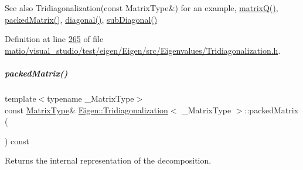 \begin{DoxySeeAlso}{See also}
Tridiagonalization(const Matrix\+Type\&) for an example, \hyperlink{group___eigenvalues___module_a000f7392eda930576ffd2af1fae54af2}{matrix\+Q()}, \hyperlink{group___eigenvalues___module_a47858b3895e64acafb1bb2e97f98a154}{packed\+Matrix()}, \hyperlink{group___eigenvalues___module_a0b7ff4860aa6f7c0761b1059c012fd8e}{diagonal()}, \hyperlink{group___eigenvalues___module_ac423dbb91157c159bdcb4b5a8371232e}{sub\+Diagonal()} 
\end{DoxySeeAlso}


Definition at line \hyperlink{matio_2visual__studio_2test_2eigen_2_eigen_2src_2_eigenvalues_2_tridiagonalization_8h_source_l00265}{265} of file \hyperlink{matio_2visual__studio_2test_2eigen_2_eigen_2src_2_eigenvalues_2_tridiagonalization_8h_source}{matio/visual\+\_\+studio/test/eigen/\+Eigen/src/\+Eigenvalues/\+Tridiagonalization.\+h}.

\mbox{\label{group___eigenvalues___module_a47858b3895e64acafb1bb2e97f98a154}} 
\subparagraph{\texorpdfstring{packed\+Matrix()}{packedMatrix()}\hspace{0.1cm}{\footnotesize\ttfamily [1/2]}}
{\footnotesize\ttfamily template$<$typename \+\_\+\+Matrix\+Type$>$ \\
const \hyperlink{group___eigenvalues___module_add0f4b2216d0ea8ee0f7d8525deaf0a9}{Matrix\+Type}\& \hyperlink{group___eigenvalues___module_class_eigen_1_1_tridiagonalization}{Eigen\+::\+Tridiagonalization}$<$ \+\_\+\+Matrix\+Type $>$\+::packed\+Matrix (\begin{DoxyParamCaption}{ }\end{DoxyParamCaption}) const\hspace{0.3cm}{\ttfamily [inline]}}



Returns the internal representation of the decomposition. 

